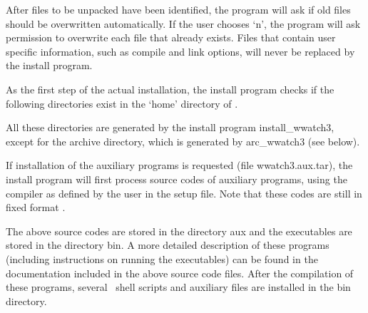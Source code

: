 After files to be unpacked have been identified, the program will ask if old
files should be overwritten automatically. If the user chooses `n', the
program will ask permission to overwrite each file that already exists. Files
that contain user specific information, such as compile and link options, will
never be replaced by the install program.

As the first step of the actual installation, the install program checks if
the following directories exist in the `home' directory of \ws.
 
\begin{dlist}
\end{dlist}

\noindent
All these directories are generated by the install program {\file
install\_wwatch3}, except for the archive directory, which is generated by
{\file arc\_wwatch3} (see below).

If installation of the auxiliary programs is requested (file {\file
wwatch3.aux.tar}), the install program will first process source codes of
auxiliary programs, using the compiler as defined by the user in the setup
file. Note that these codes are still in fixed format .

\begin{flist}


\end{flist}

\noindent
The above source codes are stored in the directory {\dir aux} and the
executables are stored in the directory {\dir bin}. A more detailed
description of these programs (including instructions on running the
executables) can be found in the documentation included in the above source
code files. After the compilation of these programs, several \unix\ shell
scripts and auxiliary files are installed in the {\dir bin} directory.

